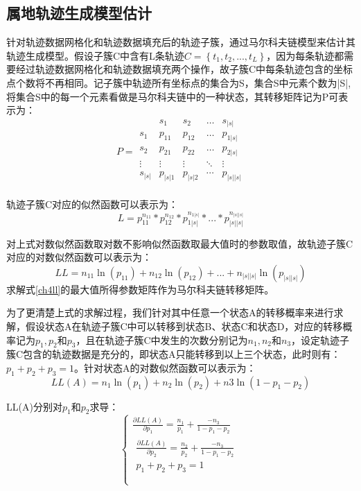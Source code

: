 \subsection{属地轨迹生成模型估计}
针对轨迹数据网格化和轨迹数据填充后的轨迹子簇，通过马尔科夫链模型来估计其轨迹生成模型。假设子簇C中含有L条轨迹$C=\left\{ t_1,t_2,...,t_L \right\} $，因为每条轨迹都需要经过轨迹数据网格化和轨迹数据填充两个操作，故子簇C中每条轨迹包含的坐标点个数将不再相同。记子簇中轨迹所有坐标点的集合为S，集合S中元素个数为|S|,将集合S中的每一个元素看做是马尔科夫链中的一种状态，其转移矩阵记为P可表示为：
\begin{equation}
\label{transitionmatrix}
P=\begin{array}{c|cccc}
	&		s_1&		s_2&		\dots&		s_{|s|}\\
	\hline
	s_1&		p_{11}&		p_{12}&		\dots&		p_{1|s|}\\
	s_2&		p_{21}&		p_{22}&		\dots&		p_{2|s|}\\
	\vdots&		\vdots&		\vdots&		\ddots&		\vdots\\
	s_{|s|}&		p_{|s|1}&		p_{|s|2}&		\cdots&		p_{|s||s|}\\
\end{array}
\end{equation}

轨迹子簇C对应的似然函数可以表示为：
\[
L=p_{11}^{n_{11}}*p_{12}^{n_{12}}*p_{1|s|}^{n_{1|s|}}*...*p_{|s||s|}^{n_{|s||s|}}
\]

对上式对数似然函数取对数不影响似然函数取最大值时的参数取值，故轨迹子簇C对应的对数似然函数可以表示为：
\begin{equation}
\label{ch4ll}
LL=n_{11}\ln \left( p_{11} \right) +n_{12}\ln \left( p_{12} \right) +...+n_{|s||s|}\ln \left( p_{|s||s|} \right) 
\end{equation}
求解式\ref{ch4ll}的最大值所得参数矩阵作为马尔科夫链转移矩阵。

为了更清楚上式的求解过程，我们针对其中任意一个状态A的转移概率来进行求解，假设状态A在轨迹子簇C中可以转移到状态B、状态C和状态D，对应的转移概率记为$p_1,p_2和p_3$，且在轨迹子簇C中发生的次数分别记为$n_1,n_2和n_3$，设定轨迹子簇C包含的轨迹数据是充分的，即状态A只能转移到以上三个状态，此时则有：$p_1+p_2+p_3=1$。针对状态A的对数似然函数可以表示为：
\[
LL\left( A \right) =n_1\ln \left( p_1 \right) +n_2\ln \left( p_2 \right) +n3\ln \left( 1-p_1-p_2 \right) 
\]

LL(A)分别对$p_1$和$p_2$求导：
\[
\begin{cases}
	\frac{\partial LL\left( A \right)}{\partial p_1}=\frac{n_1}{p_1}+\frac{-n_3}{1-p_1-p_2}\\
	\begin{array}{c}
	\frac{\partial LL\left( A \right)}{\partial p_2}=\frac{n_2}{p_2}+\frac{-n_3}{1-p_1-p_2}\\
	p_1+p_2+p_3=1\\
\end{array}\\
\end{cases}
\]

